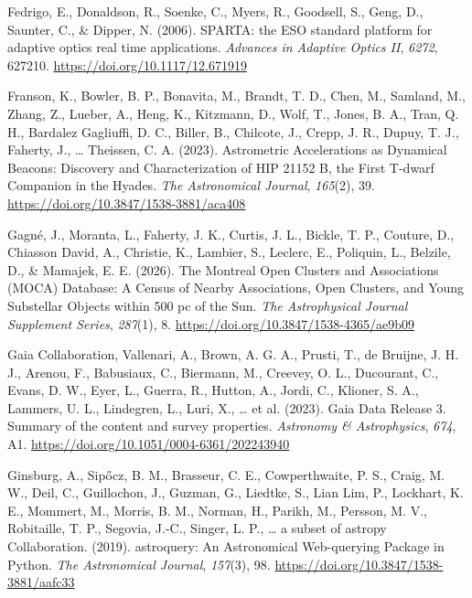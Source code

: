 \documentclass[
]{article}
\newlength{\cslhangindent}
\newenvironment{CSLReferences}[2] %
 {\begin{list}{}{%
  \setlength{\itemindent}{0pt}
  \setlength{\leftmargin}{0pt}
  \setlength{\parsep}{0pt}
  \ifodd #1
   \setlength{\leftmargin}{\cslhangindent}
   \setlength{\itemindent}{-1\cslhangindent}
  \fi
  \setlength{\itemsep}{#2\baselineskip}}}
 {\end{list}}
\begin{document}
\begin{CSLReferences}{1}{0}
Fedrigo, E., Donaldson, R., Soenke, C., Myers, R., Goodsell, S., Geng,
D., Saunter, C., \& Dipper, N. (2006). {SPARTA: the ESO standard
platform for adaptive optics real time applications}. \emph{Advances in
Adaptive Optics II}, \emph{6272}, 627210.
\url{https://doi.org/10.1117/12.671919}

Franson, K., Bowler, B. P., Bonavita, M., Brandt, T. D., Chen, M.,
Samland, M., Zhang, Z., Lueber, A., Heng, K., Kitzmann, D., Wolf, T.,
Jones, B. A., Tran, Q. H., Bardalez Gagliuffi, D. C., Biller, B.,
Chilcote, J., Crepp, J. R., Dupuy, T. J., Faherty, J., \ldots{}
Theissen, C. A. (2023). {Astrometric Accelerations as Dynamical Beacons:
Discovery and Characterization of HIP 21152 B, the First T-dwarf
Companion in the Hyades}. \emph{The Astronomical Journal},
\emph{165}(2), 39. \url{https://doi.org/10.3847/1538-3881/aca408}

Gagné, J., Moranta, L., Faherty, J. K., Curtis, J. L., Bickle, T. P.,
Couture, D., Chiasson David, A., Christie, K., Lambier, S., Leclerc, E.,
Poliquin, L., Belzile, D., \& Mamajek, E. E. (2026). {The Montreal Open
Clusters and Associations (MOCA) Database: A Census of Nearby
Associations, Open Clusters, and Young Substellar Objects within 500 pc
of the Sun}. \emph{The Astrophysical Journal Supplement Series},
\emph{287}(1), 8. \url{https://doi.org/10.3847/1538-4365/ae9b09}

Gaia Collaboration, Vallenari, A., Brown, A. G. A., Prusti, T., de
Bruijne, J. H. J., Arenou, F., Babusiaux, C., Biermann, M., Creevey, O.
L., Ducourant, C., Evans, D. W., Eyer, L., Guerra, R., Hutton, A.,
Jordi, C., Klioner, S. A., Lammers, U. L., Lindegren, L., Luri, X.,
\ldots{} et al. (2023). {Gaia Data Release 3. Summary of the content and
survey properties}. \emph{Astronomy \& Astrophysics}, \emph{674}, A1.
\url{https://doi.org/10.1051/0004-6361/202243940}

Ginsburg, A., Sipőcz, B. M., Brasseur, C. E., Cowperthwaite, P. S.,
Craig, M. W., Deil, C., Guillochon, J., Guzman, G., Liedtke, S., Lian
Lim, P., Lockhart, K. E., Mommert, M., Morris, B. M., Norman, H.,
Parikh, M., Persson, M. V., Robitaille, T. P., Segovia, J.-C., Singer,
L. P., \ldots{} a subset of astropy Collaboration. (2019). {astroquery:
An Astronomical Web-querying Package in Python}. \emph{The Astronomical
Journal}, \emph{157}(3), 98.
\url{https://doi.org/10.3847/1538-3881/aafc33}


\end{CSLReferences}
\end{document}
